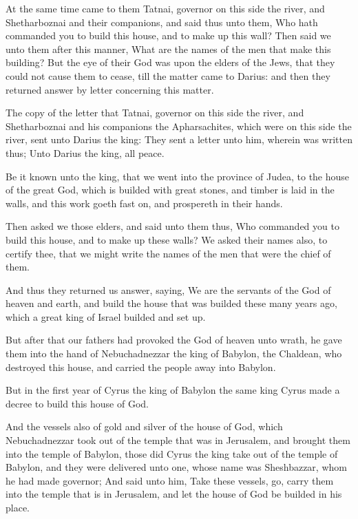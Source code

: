 \Verse At the same time came to them Tatnai, governor on this side the river, and Shetharboznai and their companions, and said thus unto them, Who hath commanded you to build this house, and to make up this wall?  \Verse Then said we unto them after this manner, What are the names of the men that make this building?  \Verse But the eye of their God was upon the elders of the Jews, that they could not cause them to cease, till the matter came to Darius: and then they returned answer by letter concerning this matter.

\Verse The copy of the letter that Tatnai, governor on this side the river, and Shetharboznai and his companions the Apharsachites, which were on this side the river, sent unto Darius the king: \Verse They sent a letter unto him, wherein was written thus; Unto Darius the king, all peace.

\Verse Be it known unto the king, that we went into the province of Judea, to the house of the great God, which is builded with great stones, and timber is laid in the walls, and this work goeth fast on, and prospereth in their hands.

\Verse Then asked we those elders, and said unto them thus, Who commanded you to build this house, and to make up these walls?  \Verse We asked their names also, to certify thee, that we might write the names of the men that were the chief of them.

\Verse And thus they returned us answer, saying, We are the servants of the God of heaven and earth, and build the house that was builded these many years ago, which a great king of Israel builded and set up.

\Verse But after that our fathers had provoked the God of heaven unto wrath, he gave them into the hand of Nebuchadnezzar the king of Babylon, the Chaldean, who destroyed this house, and carried the people away into Babylon.

\Verse But in the first year of Cyrus the king of Babylon the same king Cyrus made a decree to build this house of God.

\Verse And the vessels also of gold and silver of the house of God, which Nebuchadnezzar took out of the temple that was in Jerusalem, and brought them into the temple of Babylon, those did Cyrus the king take out of the temple of Babylon, and they were delivered unto one, whose name was Sheshbazzar, whom he had made governor; \Verse And said unto him, Take these vessels, go, carry them into the temple that is in Jerusalem, and let the house of God be builded in his place.

